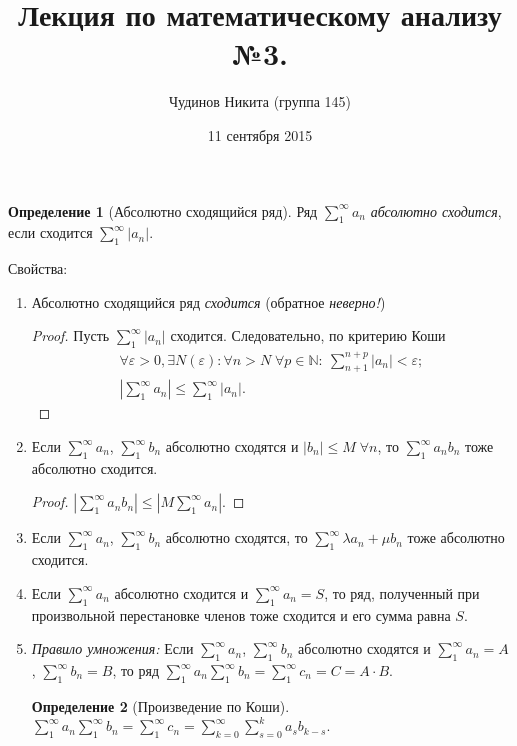 \documentclass[a4paper,12pt]{article}
\theoremstyle{remark}
\theoremstyle{definition}
\newtheorem{definition}{Определение}
\begin{document}
\sloppy
\author{Чудинов Никита (группа 145)}
\date{11 сентября 2015}
\title{\vspace{-2.0cm}Лекция по математическому анализу №3.}
\frenchspacing
 
\maketitle

\begin{definition}[Абсолютно сходящийся ряд]
    Ряд \(\sum_1^\infty a_n\) \emph{абсолютно сходится}, если сходится \(\sum_1^\infty |a_n|\).
\end{definition}

Свойства:
\begin{enumerate}
    \item Абсолютно сходящийся ряд \emph{сходится} (обратное \emph{неверно!})
    \begin{proof}
        Пусть \(\sum_1^\infty |a_n|\) сходится. Следовательно, по критерию Коши 
        \begin{gather*}
            \forall \varepsilon > 0, \exists N(\varepsilon): \forall n > N\; \forall p \in \mathbb{N}:\ \sum_{n+1}^{n+p} |a_n| < \varepsilon; \\
            \left| \sum_1^\infty a_n \right| \leqslant \sum_1^\infty |a_n|.
        \end{gather*}
    \end{proof}
    \item Если \(\sum_1^\infty a_n\), \(\sum_1^\infty b_n\) абсолютно сходятся и \(|b_n| \leqslant M \;\forall n\), то \(\sum_1^\infty a_n b_n\) тоже абсолютно сходится.
    \begin{proof}
        \(\left| \sum_1^\infty a_n b_n \right| \leqslant \left| M\sum_1^\infty a_n \right|\).
    \end{proof}
    \item Если \(\sum_1^\infty a_n\), \(\sum_1^\infty b_n\) абсолютно сходятся, то \(\sum_1^\infty \lambda a_n + \mu b_n\) тоже абсолютно сходится.
    \item Если \(\sum_1^\infty a_n\) абсолютно сходится и \(\sum_1^\infty a_n = S\), то ряд, полученный при произвольной перестановке членов тоже сходится и его сумма равна \(S\).
    \item \emph{Правило умножения:} Если \(\sum_1^\infty a_n\), \(\sum_1^\infty b_n\) абсолютно сходятся и \(\sum_1^\infty a_n = A\), \(\sum_1^\infty b_n = B\), то ряд \(\sum_1^\infty a_n \sum_1^\infty b_n = \sum_1^\infty c_n = C = A \cdot B\).
    \begin{definition}[Произведение по Коши]
        \(\sum_1^\infty a_n \sum_1^\infty b_n = \sum_1^\infty c_n = \sum_{k = 0}^\infty \sum_{s = 0}^k a_s b_{k-s}\).
    \end{definition}
\end{enumerate}
\end{document}
